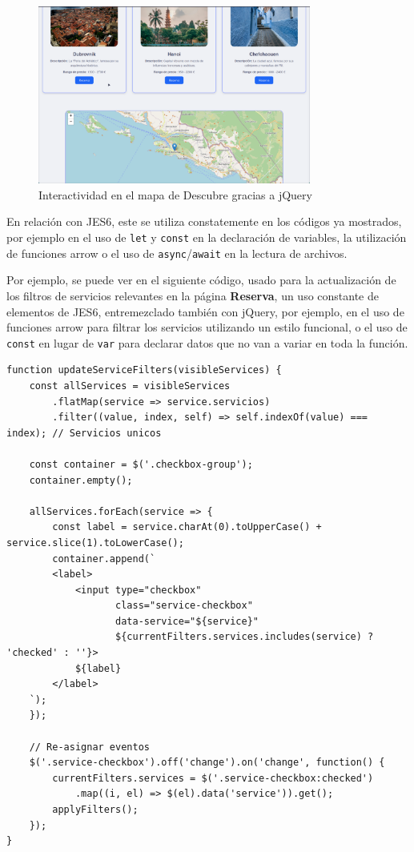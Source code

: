 \documentclass[11pt, a4paper]{book}
\begin{document}
	\begin{figure} [H]
		\centering
        \includegraphics[width=0.8\textwidth]{CSS/4 extra.png}
		\caption{Interactividad en el mapa de Descubre gracias a jQuery}
	\end{figure}

    En relación con JES6, este se utiliza constatemente en los códigos ya mostrados, por ejemplo en el uso de \texttt{let} y \texttt{const} en la declaración de variables, la utilización de funciones arrow o el uso de \texttt{async}/\texttt{await} en la lectura de archivos.

    Por ejemplo, se puede ver en el siguiente código, usado para la actualización de los filtros de servicios relevantes en la página \textbf{Reserva}, un uso constante de elementos de JES6, entremezclado también con jQuery, por ejemplo, en el uso de funciones arrow para filtrar los servicios utilizando un estilo funcional, o el uso de \texttt{const} en lugar de \texttt{var} para declarar datos que no van a variar en toda la función. 

    \begin{lstlisting}
function updateServiceFilters(visibleServices) {
    const allServices = visibleServices
        .flatMap(service => service.servicios)
        .filter((value, index, self) => self.indexOf(value) === index); // Servicios unicos

    const container = $('.checkbox-group');
    container.empty();

    allServices.forEach(service => {
        const label = service.charAt(0).toUpperCase() + service.slice(1).toLowerCase();
        container.append(`
        <label>
            <input type="checkbox" 
                   class="service-checkbox" 
                   data-service="${service}"
                   ${currentFilters.services.includes(service) ? 'checked' : ''}>
            ${label}
        </label>
    `);
    });

    // Re-asignar eventos
    $('.service-checkbox').off('change').on('change', function() {
        currentFilters.services = $('.service-checkbox:checked')
            .map((i, el) => $(el).data('service')).get();
        applyFilters();
    });
}
    \end{lstlisting}
	
\end{document}
